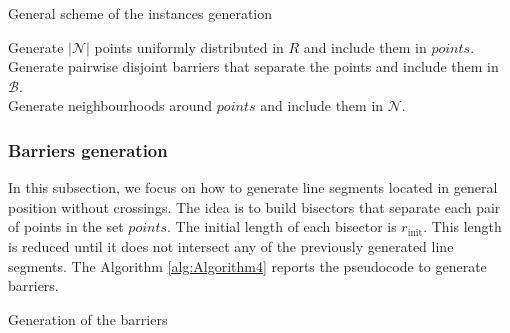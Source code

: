 \documentclass[a4paper,  review, authoryear, 1p., doubleblind]{elsarticle}
\newcommand{\CV}[1]{{\color{red}#1}}
\begin{document}
\begin{algorithm}[H]
	\caption{General scheme of the instances generation}
	\label{alg:Algorithm3}
	
	Generate $|\mathcal N|$ points uniformly distributed in $R$ and include them in $points$. \\
	Generate pairwise disjoint barriers that separate the points and include them in $\mathcal B$. \\
	Generate neighbourhoods around $points$ and include them in $\mathcal N$. 
\end{algorithm}


\subsubsection*{Barriers generation}
In this subsection, we focus on how to generate line segments located in general position without crossings. The idea is to build bisectors that separate each pair of points in the set $points$. The initial length of each bisector is $r_{\text{init}}$. This length is reduced until it does not intersect any of the previously generated line segments. The Algorithm \ref{alg:Algorithm4} reports the pseudocode to generate barriers.

\begin{algorithm}[H]
	\caption{Generation of the barriers}
	\label{alg:Algorithm4}
	
\end{algorithm}
\end{document}
